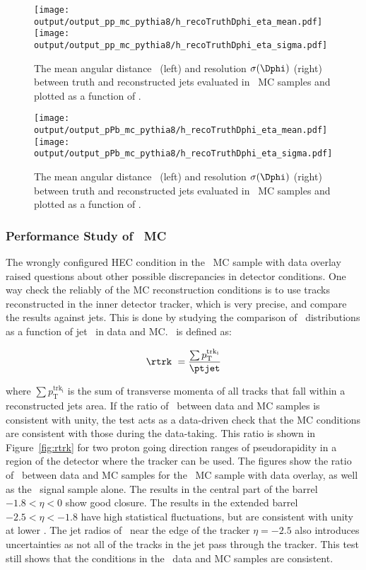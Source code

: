 \begin{figure}
	\centerline{
		\texttt{[image: output/output\_pp\_mc\_pythia8/h\_recoTruthDphi\_eta\_mean.pdf]} 
		\texttt{[image: output/output\_pp\_mc\_pythia8/h\_recoTruthDphi\_eta\_sigma.pdf]}
	}
	\caption{The mean angular distance \Dphi\ (left) and resolution $\sigma(\Dphi)$ (right) between truth and reconstructed jets evaluated in \pp\ MC samples and plotted as a function of \pttruth. }
	\label{fig:dphipp}
\end{figure}

\begin{figure}[h]
	\centerline{
		\texttt{[image: output/output\_pPb\_mc\_pythia8/h\_recoTruthDphi\_eta\_mean.pdf]}
		\texttt{[image: output/output\_pPb\_mc\_pythia8/h\_recoTruthDphi\_eta\_sigma.pdf]}
	}
	\caption{ The mean angular distance \Dphi\ (left) and resolution $\sigma(\Dphi)$ (right) between truth and reconstructed jets evaluated in \pPb\ MC samples and plotted as a function of \pttruth. }
	\label{fig:dphipPb}
\end{figure}


\subsubsection{Performance Study of \pPb\ MC}
The wrongly configured HEC condition in the \pPb\ MC sample with data overlay raised questions about other possible discrepancies in detector conditions. One way check the reliably of the MC reconstruction conditions is to use tracks reconstructed in the inner detector tracker, which is very precise, and compare the results against jets. This is done by studying the comparison of  \rtrk\ distributions as a function of jet \pt\ in data and MC. \rtrk\ is defined as:

\begin{equation}
\rtrk\ = \frac{\sum p_{\mathrm{T}}^{\mathrm{trk_{i}}}}{\ptjet}
\end{equation}

where $\sum p_{\mathrm{T}}^{\mathrm{trk_{i}}}$ is the sum of transverse momenta of all tracks that fall within a reconstructed jets area. If the ratio of \rtrk\ between data and MC samples is consistent with unity, the test acts as a data-driven check that the MC conditions are consistent with those during the data-taking. This ratio is shown in Figure~\ref{fig:rtrk} for two proton going direction ranges of pseudorapidity in a region of the detector where the tracker can be used. The figures show the ratio of \rtrk\ between data and MC samples for the \pPb\ MC sample with data overlay, as well as the \pPb\ signal sample alone. The results in the central part of the barrel $-1.8<\eta<0$ show good closure. The results in the extended barrel $-2.5<\eta<-1.8$ have high statistical fluctuations, but are consistent with unity at lower \pt. The jet radios of \RFour\ near the edge of the tracker $\eta=-2.5$ also introduces uncertainties as not all of the tracks in the jet pass through the tracker. This test still shows that the conditions in the \pPb\ data and MC samples are consistent.

